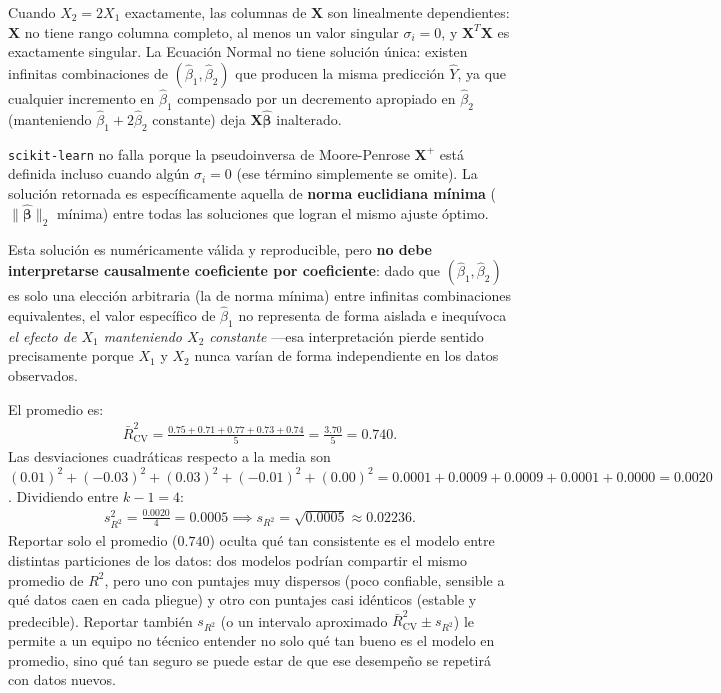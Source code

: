 \begin{solproblema}[prob:5ad88f8]
	Cuando $X_2=2X_1$ exactamente, las columnas de $\mathbf{X}$ son linealmente dependientes: $\mathbf{X}$ no tiene rango columna completo, al menos un valor singular $\sigma_i=0$, y $\mathbf{X}^T\mathbf{X}$ es exactamente singular. La Ecuación Normal no tiene solución única: existen infinitas combinaciones de $(\hat\beta_1,\hat\beta_2)$ que producen la misma predicción $\hat Y$, ya que cualquier incremento en $\hat\beta_1$ compensado por un decremento apropiado en $\hat\beta_2$ (manteniendo $\hat\beta_1+2\hat\beta_2$ constante) deja $\mathbf{X}\hat{\boldsymbol\beta}$ inalterado.

	\texttt{scikit-learn} no falla porque la pseudoinversa de Moore-Penrose $\mathbf{X}^+$ está definida incluso cuando algún $\sigma_i=0$ (ese término simplemente se omite). La solución retornada es específicamente aquella de \textbf{norma euclidiana mínima} ($\|\hat{\boldsymbol\beta}\|_2$ mínima) entre todas las soluciones que logran el mismo ajuste óptimo.

	Esta solución es numéricamente válida y reproducible, pero \textbf{no debe interpretarse causalmente coeficiente por coeficiente}: dado que $(\hat\beta_1,\hat\beta_2)$ es solo una elección arbitraria (la de norma mínima) entre infinitas combinaciones equivalentes, el valor específico de $\hat\beta_1$ no representa de forma aislada e inequívoca \emph{el efecto de $X_1$ manteniendo $X_2$ constante} —esa interpretación pierde sentido precisamente porque $X_1$ y $X_2$ nunca varían de forma independiente en los datos observados.
\end{solproblema}

\begin{solproblema}
	El promedio es:
	\begin{align}
		\bar{R}_{\text{CV}}^2 = \frac{0.75+0.71+0.77+0.73+0.74}{5} = \frac{3.70}{5} = 0.740.
	\end{align}
	Las desviaciones cuadráticas respecto a la media son $(0.01)^2+(-0.03)^2+(0.03)^2+(-0.01)^2+(0.00)^2 = 0.0001+0.0009+0.0009+0.0001+0.0000 = 0.0020$. Dividiendo entre $k-1=4$:
	\begin{align}
		s_{R^2}^2 = \frac{0.0020}{4} = 0.0005 \implies s_{R^2} = \sqrt{0.0005} \approx 0.02236.
	\end{align}
	Reportar solo el promedio ($0.740$) oculta qué tan consistente es el modelo entre distintas particiones de los datos: dos modelos podrían compartir el mismo promedio de $R^2$, pero uno con puntajes muy dispersos (poco confiable, sensible a qué datos caen en cada pliegue) y otro con puntajes casi idénticos (estable y predecible). Reportar también $s_{R^2}$ (o un intervalo aproximado $\bar{R}_{\text{CV}}^2 \pm s_{R^2}$) le permite a un equipo no técnico entender no solo qué tan bueno es el modelo en promedio, sino qué tan seguro se puede estar de que ese desempeño se repetirá con datos nuevos.
\end{solproblema}
